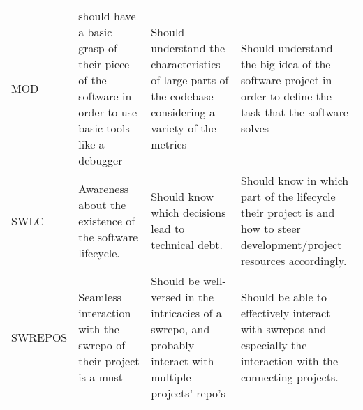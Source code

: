 \documentclass[a4paper
]{article}
\begin{document}
\begin{landscape}
\begin{longtable}[]{@{}llll@{}}
\begin{minipage}[t]{0.19\columnwidth}
MOD\strut
\end{minipage} & \begin{minipage}[t]{0.28\columnwidth}\raggedright
should have a basic grasp of their piece of the software in order to use
basic tools like a debugger\strut
\end{minipage} & \begin{minipage}[t]{0.28\columnwidth}\raggedright
Should understand the characteristics of large parts of the codebase
considering a variety of the metrics\strut
\end{minipage} & \begin{minipage}[t]{0.14\columnwidth}\raggedright
Should understand the big idea of the software project in order to
define the task that the software solves\strut
\end{minipage}\tabularnewline
\begin{minipage}[t]{0.19\columnwidth}\raggedright
SWLC\strut
\end{minipage} & \begin{minipage}[t]{0.28\columnwidth}\raggedright
Awareness about the existence of the software lifecycle.\strut
\end{minipage} & \begin{minipage}[t]{0.28\columnwidth}\raggedright
Should know which decisions lead to technical debt.\strut
\end{minipage} & \begin{minipage}[t]{0.14\columnwidth}\raggedright
Should know in which part of the lifecycle their project is and how to
steer development/project resources accordingly.\strut
\end{minipage}\tabularnewline
\begin{minipage}[t]{0.19\columnwidth}\raggedright
SWREPOS\strut
\end{minipage} & \begin{minipage}[t]{0.28\columnwidth}\raggedright
Seamless interaction with the swrepo of their project is a must\strut
\end{minipage} & \begin{minipage}[t]{0.28\columnwidth}\raggedright
Should be well-versed in the intricacies of a swrepo, and probably
interact with multiple projects' repo's\strut
\end{minipage} & \begin{minipage}[t]{0.14\columnwidth}\raggedright
Should be able to effectively interact with swrepos and especially the
interaction with the connecting projects.\strut
\end{minipage}\tabularnewline

\end{longtable}
\end{landscape}
\end{document}
